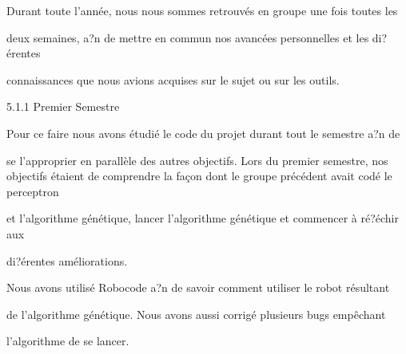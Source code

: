 \documentclass[a4paper,portrait,12pt]{article}
\begin{document}
\begin{flushleft}
Durant toute l'ann\'{e}e, nous nous sommes retrouv\'{e}s en groupe une fois toutes les
\end{flushleft}


\begin{flushleft}
deux semaines, a?n de mettre en commun nos avanc\'{e}es personnelles et les di?\'{e}rentes
\end{flushleft}


\begin{flushleft}
connaissances que nous avions acquises sur le sujet ou sur les outils.
\end{flushleft}





\begin{flushleft}
5.1.1 Premier Semestre
\end{flushleft}


\begin{flushleft}
Pour ce faire nous avons \'{e}tudi\'{e} le code du projet durant tout le semestre a?n de
\end{flushleft}


\begin{flushleft}
se l'approprier en parall\`{e}le des autres objectifs. Lors du premier semestre, nos objectifs \'{e}taient de comprendre la fa\c{c}on dont le groupe pr\'{e}c\'{e}dent avait cod\'{e} le perceptron
\end{flushleft}


\begin{flushleft}
et l'algorithme g\'{e}n\'{e}tique, lancer l'algorithme g\'{e}n\'{e}tique et commencer \`{a} r\'{e}?\'{e}chir aux
\end{flushleft}


\begin{flushleft}
di?\'{e}rentes am\'{e}liorations.
\end{flushleft}


\begin{flushleft}
Nous avons utilis\'{e} Robocode a?n de savoir comment utiliser le robot r\'{e}sultant
\end{flushleft}


\begin{flushleft}
de l'algorithme g\'{e}n\'{e}tique. Nous avons aussi corrig\'{e} plusieurs bugs emp\^{e}chant
\end{flushleft}


\begin{flushleft}
l'algorithme de se lancer.
\end{flushleft}
\end{document}
